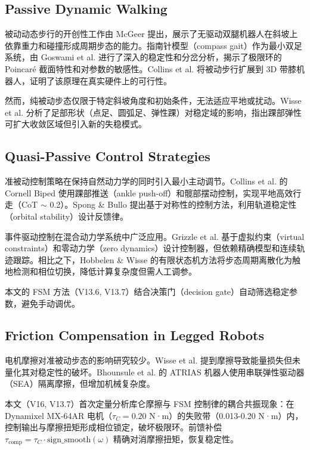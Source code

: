 
\subsection{Passive Dynamic Walking}

被动动态步行的开创性工作由 McGeer \cite{McGeer1990} 提出，展示了无驱动双腿机器人在斜坡上依靠重力和碰撞形成周期步态的能力。指南针模型（compass gait）作为最小双足系统，由 Goswami et al. \cite{Goswami1996,Goswami1998} 进行了深入的稳定性和分岔分析，揭示了极限环的 Poincaré 截面特性和对参数的敏感性。Collins et al. \cite{Collins2001} 将被动步行扩展到 3D 带膝机器人，证明了该原理在真实硬件上的可行性。

然而，纯被动步态仅限于特定斜坡角度和初始条件，无法适应平地或扰动。Wisse et al. \cite{Wisse2007} 分析了足部形状（点足、圆弧足、弹性踝）对稳定域的影响，指出踝部弹性可扩大收敛区域但引入新的失稳模式。

\subsection{Quasi-Passive Control Strategies}

准被动控制策略在保持自然动力学的同时引入最小主动调节。Collins et al. \cite{Collins2005} 的 Cornell Biped 使用踝部推送（ankle push-off）和髋部摆动控制，实现平地高效行走（CoT $\sim$ 0.2）。Spong \& Bullo \cite{Spong2005} 提出基于对称性的控制方法，利用轨道稳定性（orbital stability）设计反馈律。

事件驱动控制在混合动力学系统中广泛应用。Grizzle et al. \cite{Grizzle2014} 基于虚拟约束（virtual constraints）和零动力学（zero dynamics）设计控制器，但依赖精确模型和连续轨迹跟踪。相比之下，Hobbelen \& Wisse \cite{Hobbelen2008} 的有限状态机方法将步态周期离散化为触地检测和相位切换，降低计算复杂度但需人工调参。

本文的 FSM 方法（V13.6, V13.7）结合决策门（decision gate）自动筛选稳定参数，避免手动调优。

\subsection{Friction Compensation in Legged Robots}

电机摩擦对准被动步态的影响研究较少。Wisse et al. \cite{Wisse2007} 提到摩擦导致能量损失但未量化其对稳定性的破坏。Bhounsule et al. \cite{Bhounsule2014} 的 ATRIAS 机器人使用串联弹性驱动器（SEA）隔离摩擦，但增加机械复杂度。

本文（V16, V13.7）首次定量分析库仑摩擦与 FSM 控制律的耦合共振现象：在 Dynamixel MX-64AR 电机（$\tau_C = 0.20$ N·m）的失败带（0.013-0.20 N·m）内，控制输出与摩擦扭矩形成相位锁定，破坏极限环。前馈补偿 $\tau_{\text{comp}} = \tau_C \cdot \text{sign\_smooth}(\omega)$ 精确对消摩擦扭矩，恢复稳定性。

